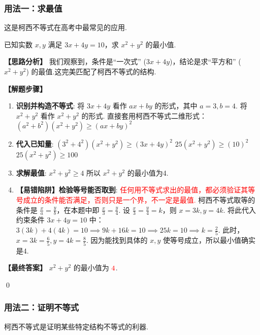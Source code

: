 \subsubsection{用法一：求最值}
这是柯西不等式在高考中最常见的应用.

\begin{exercise}
	已知实数 $x,y$ 满足 $3x+4y=10$，求 $x^2+y^2$ 的最小值.
\end{exercise}
\begin{solution}
	\textbf{【思路分析】}
	\textcolor{green!50!black}{我们观察到，条件是“一次式” ($3x+4y$)，结论是求“平方和” ($x^2+y^2$) 的最值.这完美匹配了柯西不等式的结构.}
	
	\textbf{【解题步骤】}
	\begin{enumerate}
		\item \textbf{识别并构造不等式}:
		将 $3x+4y$ 看作 $ax+by$ 的形式，其中 $a=3, b=4$.
		将 $x^2+y^2$ 看作 $x^2+y^2$ 的形式.
		直接套用柯西不等式二维形式：
		$(a^2+b^2)(x^2+y^2) \ge (ax+by)^2$
		
		\item \textbf{代入已知量}:
		$(3^2+4^2)(x^2+y^2) \ge (3x+4y)^2$
		$25(x^2+y^2) \ge (10)^2$
		$25(x^2+y^2) \ge 100$
		
		\item \textbf{求解最值}:
		$x^2+y^2 \ge 4$
		所以 $x^2+y^2$ 的最小值为4.
		
		\item \textbf{【易错陷阱】检验等号能否取到}:
		\textcolor{red}{任何用不等式求出的最值，都必须验证其等号成立的条件能否满足，否则只是一个界，不一定是最值.}
		柯西不等式取等的条件是 $\frac{x}{a} = \frac{y}{b}$，在本题中即 $\frac{x}{3} = \frac{y}{4}$.
		设 $\frac{x}{3} = \frac{y}{4} = k$，则 $x=3k, y=4k$.
		将此代入约束条件 $3x+4y=10$ 中：
		$3(3k) + 4(4k) = 10 \implies 9k+16k=10 \implies 25k=10 \implies k=\frac{2}{5}$.
		此时，$x=3k=\frac{6}{5}, y=4k=\frac{8}{5}$.
		因为能找到具体的 $x,y$ 使等号成立，所以最小值确实是4.
	\end{enumerate}
	\textbf{【最终答案】} $x^2+y^2$ 的最小值为 $\textcolor{red}{4}$.
\end{solution}
\qed

\subsubsection{用法二：证明不等式}
柯西不等式是证明某些特定结构不等式的利器.

